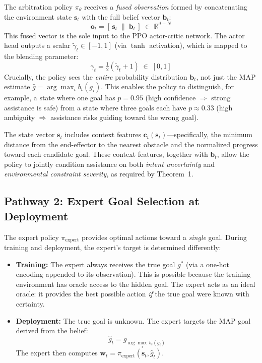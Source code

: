 \documentclass[11pt]{article}
\newcommand{\bvec}{\mathbf{b}_t}
\newcommand{\svec}{\mathbf{s}_t}
\newcommand{\cvec}{\mathbf{c}_t}
\newcommand{\wvec}{\mathbf{w}_t}
\newcommand{\real}{\mathbb{R}}
\begin{document}
The arbitration policy $\pi_\theta$ receives a \emph{fused observation} formed by concatenating the environment state $\svec$ with the full belief vector $\bvec$:
\begin{equation}
    \mathbf{o}_t = [\,\svec \;\|\; \bvec\,] \;\in\; \real^{d + N}
    \label{eq:fused-obs}
\end{equation}
This fused vector is the sole input to the PPO actor-critic network.  The actor head outputs a scalar $\tilde{\gamma}_t \in [-1,1]$ (via $\tanh$ activation), which is mapped to the blending parameter:
\begin{equation}
    \gamma_t = \tfrac{1}{2}(\tilde{\gamma}_t + 1) \;\in\; [0,1]
    \label{eq:gamma-map}
\end{equation}
Crucially, the policy sees the \emph{entire} probability distribution $\bvec$, not just the MAP estimate $\hat{g} = \arg\max_i b_t(g_i)$.
This enables the policy to distinguish, for example, a state where one goal has $p = 0.95$ (high confidence $\Rightarrow$ strong assistance is safe) from a state where three goals each have $p \approx 0.33$ (high ambiguity $\Rightarrow$ assistance risks guiding toward the wrong goal).

The state vector $\svec$ includes context features $\cvec(\svec)$---specifically, the minimum distance from the end-effector to the nearest obstacle and the normalized progress toward each candidate goal.
These context features, together with $\bvec$, allow the policy to jointly condition assistance on both \emph{intent uncertainty} and \emph{environmental constraint severity}, as required by Theorem~1.

\subsection{Pathway 2: Expert Goal Selection at Deployment}

The expert policy $\pi_{\text{expert}}$ provides optimal actions toward a \emph{single} goal.
During training and deployment, the expert's target is determined differently:

\begin{itemize}
    \item \textbf{Training:} The expert always receives the true goal $g^*$ (via a one-hot encoding appended to its observation).
    This is possible because the training environment has oracle access to the hidden goal.
    The expert acts as an ideal oracle: it provides the best possible action \emph{if} the true goal were known with certainty.

    \item \textbf{Deployment:} The true goal is unknown.  The expert targets the MAP goal derived from the belief:
    \begin{equation}
        \hat{g}_t = g_{\arg\max_i \, b_t(g_i)}
    \end{equation}
    The expert then computes $\wvec = \pi_{\text{expert}}(\svec, \hat{g}_t)$.
\end{itemize}
\end{document}
